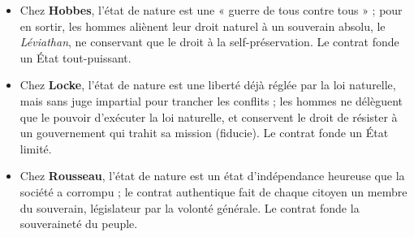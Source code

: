 \documentclass[11pt]{article}
\begin{document}
\begin{itemize}
\item Chez \textbf{Hobbes}, l'état de nature est une « guerre de tous contre tous » ; pour en sortir, les hommes aliènent leur droit naturel à un souverain absolu, le \emph{Léviathan}, ne conservant que le droit à la self-préservation. Le contrat fonde un État tout-puissant.
\item Chez \textbf{Locke}, l'état de nature est une liberté déjà réglée par la loi naturelle, mais sans juge impartial pour trancher les conflits ; les hommes ne délèguent que le pouvoir d'exécuter la loi naturelle, et conservent le droit de résister à un gouvernement qui trahit sa mission (fiducie). Le contrat fonde un État limité.
\item Chez \textbf{Rousseau}, l'état de nature est un état d'indépendance heureuse que la société a corrompu ; le contrat authentique fait de chaque citoyen un membre du souverain, législateur par la volonté générale. Le contrat fonde la souveraineté du peuple.
\end{itemize}
\end{document}
